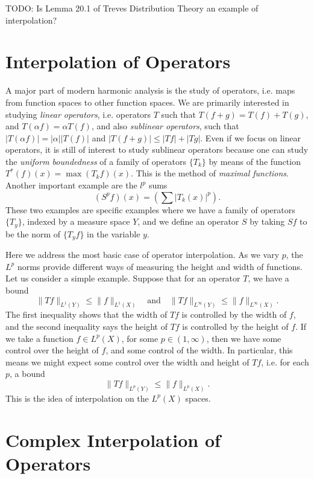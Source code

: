TODO: Is Lemma 20.1 of Treves Distribution Theory an example of interpolation?

\section{Interpolation of Operators}

A major part of modern harmonic analysis is the study of operators, i.e. maps from function spaces to other function spaces. We are primarily interested in studying \emph{linear operators}, i.e. operators $T$ such that $T(f + g) = T(f) + T(g)$, and $T(\alpha f) = \alpha T(f)$, and also \emph{sublinear operators}, such that $|T(\alpha f)| = |\alpha| |T(f)|$ and $|T(f + g)| \leq |Tf| + |Tg|$. Even if we focus on linear operators, it is still of interest to study sublinear operators because one can study the \emph{uniform boundedness} of a family of operators $\{ T_k \}$ by means of the function $T^*(f)(x) = \max (T_k f)(x)$. This is the method of \emph{maximal functions}. Another important example are the $l^p$ sums
%
\[ (S^p f)(x) = \left( \sum |T_k(x)|^p \right). \]
%
These two examples are specific examples where we have a family of operators $\{ T_y \}$, indexed by a measure space $Y$, and we define an operator $S$ by taking $Sf$ to be the norm of $\{ T_y f \}$ in the variable $y$.

Here we address the most basic case of operator interpolation. As we vary $p$, the $L^p$ norms provide different ways of measuring the height and width of functions. Let us consider a simple example. Suppose that for an operator $T$, we have a bound
%
\[ \| Tf \|_{L^1(Y)} \leq \| f \|_{L^1(X)} \quad\text{and}\quad \| Tf \|_{L^\infty(Y)} \leq \| f \|_{L^\infty(X)}. \]
%
The first inequality shows that the width of $Tf$ is controlled by the width of $f$, and the second inequality says the height of $Tf$ is controlled by the height of $f$. If we take a function $f \in L^p(X)$, for some $p \in (1,\infty)$, then we have some control over the height of $f$, and some control of the width. In particular, this means we might expect some control over the width and height of $Tf$, i.e. for each $p$, a bound
%
\[ \| Tf \|_{L^p(Y)} \leq \| f \|_{L^p(X)}. \]
%
This is the idea of interpolation on the $L^p(X)$ spaces.

\section{Complex Interpolation of Operators}

